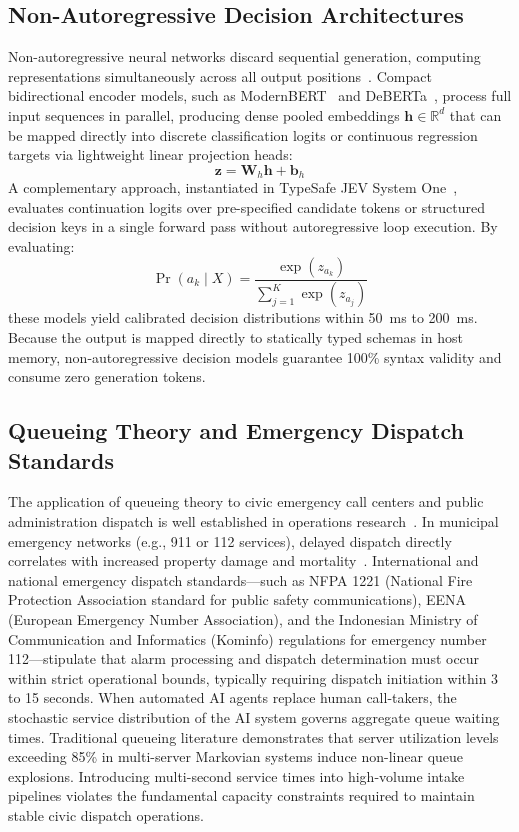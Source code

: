\documentclass[journal,compsoc]{IEEEtran}
\begin{document}
\subsection{Non-Autoregressive Decision Architectures}
Non-autoregressive neural networks discard sequential generation, computing representations simultaneously across all output positions~\cite{gu2018nonautoregressive}. Compact bidirectional encoder models, such as ModernBERT~\cite{warner2024modernbert} and DeBERTa~\cite{he2020deberta}, process full input sequences in parallel, producing dense pooled embeddings $\mathbf{h} \in \mathbb{R}^d$ that can be mapped directly into discrete classification logits or continuous regression targets via lightweight linear projection heads:
\begin{equation}
\mathbf{z} = \mathbf{W}_h \mathbf{h} + \mathbf{b}_h
\end{equation}
A complementary approach, instantiated in TypeSafe JEV System One~\cite{typesafe2025systemone}, evaluates continuation logits over pre-specified candidate tokens or structured decision keys in a single forward pass without autoregressive loop execution. By evaluating:
\begin{equation}
\Pr(a_k \mid X) = \frac{\exp(z_{a_k})}{\sum_{j=1}^{K} \exp(z_{a_j})}
\end{equation}
these models yield calibrated decision distributions within 50~ms to 200~ms. Because the output is mapped directly to statically typed schemas in host memory, non-autoregressive decision models guarantee 100\% syntax validity and consume zero generation tokens.

\subsection{Queueing Theory and Emergency Dispatch Standards}
The application of queueing theory to civic emergency call centers and public administration dispatch is well established in operations research~\cite{green2006queueing,mandelbaum2000delay}. In municipal emergency networks (e.g., 911 or 112 services), delayed dispatch directly correlates with increased property damage and mortality~\cite{zandbergen2022accuracy}. International and national emergency dispatch standards—such as NFPA 1221 (National Fire Protection Association standard for public safety communications), EENA (European Emergency Number Association), and the Indonesian Ministry of Communication and Informatics (Kominfo) regulations for emergency number 112—stipulate that alarm processing and dispatch determination must occur within strict operational bounds, typically requiring dispatch initiation within 3 to 15 seconds. When automated AI agents replace human call-takers, the stochastic service distribution of the AI system governs aggregate queue waiting times. Traditional queueing literature demonstrates that server utilization levels exceeding 85\% in multi-server Markovian systems induce non-linear queue explosions. Introducing multi-second service times into high-volume intake pipelines violates the fundamental capacity constraints required to maintain stable civic dispatch operations.
\end{document}
